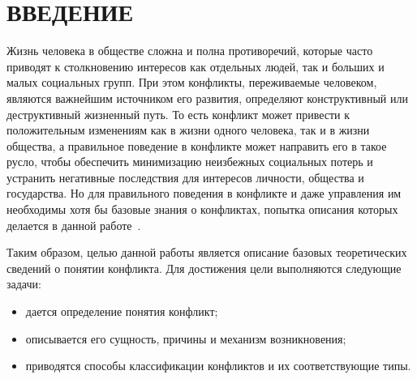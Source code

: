 \chapter*{ВВЕДЕНИЕ}

Жизнь человека в обществе сложна и полна противоречий, которые часто приводят к
столкновению интересов как отдельных людей, так и больших и малых социальных
групп. При этом конфликты, переживаемые человеком, являются важнейшим источником
его развития, определяют конструктивный или деструктивный жизненный путь. То
есть конфликт может привести к положительным изменениям как в жизни одного
человека, так и в жизни общества, а правильное поведение в конфликте может
направить его в такое русло, чтобы обеспечить минимизацию неизбежных социальных
потерь и устранить негативные последствия для интересов личности, общества и
государства. Но для правильного поведения в конфликте и даже управления им
необходимы хотя бы базовые знания о конфликтах, попытка описания которых
делается в данной работе~\cite{book01,book02}.

Таким образом, целью данной работы является описание базовых теоретических
сведений о понятии конфликта. Для достижения цели выполняются следующие задачи:
\begin{itemize}
    \item дается определение понятия конфликт;
    \item описывается его сущность, причины и механизм возникновения;
    \item приводятся способы классификации конфликтов и их соответствующие типы.
\end{itemize}
